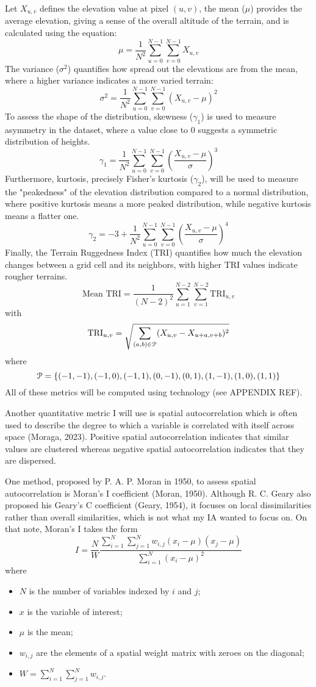 Let $X_{u,v}$ defines the elevation value at pixel $(u,v)$, the mean ($\mu$) provides the average elevation, giving a sense of the overall altitude of the 
terrain, and is calculated using the equation:
\[\mu=\frac{1}{N^2}\sum_{u=0}^{N-1}\sum_{v=0}^{N-1}X_{u,v}\]
The variance ($\sigma^2$) quantifies how spread out the elevations are from the mean, where a higher variance indicates a more varied terrain:
\[\sigma^2=\frac{1}{N^2}\sum_{u=0}^{N-1}\sum_{v=0}^{N-1}{(X_{u,v}-\mu)}^2\]
To assess the shape of the distribution, skewness ($\gamma_1$) is used to measure asymmetry in the dataset, where a value close to 0 suggests a symmetric 
distribution of heights. 
\[\gamma_1=\frac{1}{N^2}\sum_{u=0}^{N-1}\sum_{v=0}^{N-1}{\left(\frac{X_{u,v}-\mu}{\sigma}\right)}^3\]
Furthermore, kurtosis, precisely Fisher's kurtosis ($\gamma_2$), will be used to measure the "peakedness" of the elevation distribution compared to a normal distribution, where positive kurtosis 
means a more peaked distribution, while negative kurtosis means a flatter one.
\[\gamma_2=-3+\frac{1}{N^2}\sum_{u=0}^{N-1}\sum_{v=0}^{N-1}{\left(\frac{X_{u,v}-\mu}{\sigma}\right)}^4\]
Finally, the Terrain Ruggedness Index (TRI) quantifies how much the elevation changes between a grid cell and its neighbors, with higher TRI values indicate 
rougher terrains.
\[\text{Mean TRI}=\frac{1}{(N-2)^2}\sum_{u=1}^{N-2}\sum_{v=1}^{N-2}\text{TRI}_{u,v}\]
with 
\[\text{TRI}_{u,v}=\sqrt{\sum_{(a,b)\in \EuScript{P}}(X_{u,v}-{X_{u+a,v+b}})^2}\]
where
\[\EuScript{P}=\{(-1,-1),(-1,0),(-1,1),(0,-1),(0,1),(1,-1),(1,0),(1,1)\}\]
All of these metrics will be computed using technology (see APPENDIX REF).

Another quantitative metric I will use is spatial autocorrelation which is often used to describe the degree to which a variable is correlated with itself 
across space (Moraga, 2023). Positive spatial autocorrelation indicates that similar values are clustered whereas negative spatial autocorrelation indicates 
that they are dispersed. 

One method, proposed by P. A. P. Moran in 1950, to assess spatial autocorrelation is Moran's I coefficient (Moran, 1950). Although R. C. Geary also proposed 
his Geary's C coefficient (Geary, 1954), it focuses on local dissimilarities rather than overall similarities, which is not what my IA wanted to focus on. 
On that note, Moran's I takes the form
\[I=\frac{N}{W}\frac{\sum_{i=1}^{N}\sum_{j=1}^{N}w_{i,j}(x_i-\mu)(x_j-\mu)}{\sum_{i=1}^{N}{(x_i-\mu)}^2}\]
where
\begin{itemize}
    \item $N$ is the number of variables indexed by $i$ and $j$;
    \item $x$ is the variable of interest;
    \item $\mu$ is the mean;
    \item $w_{i,j}$ are the elements of a spatial weight matrix with zeroes on the diagonal;
    \item $W=\sum_{i=1}^{N}\sum_{j=1}^{N}w_{i,j}$.
\end{itemize}

